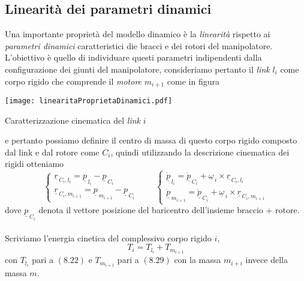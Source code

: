 \subsection{Linearità dei parametri dinamici}
Una importante proprietà del modello dinamico è la \emph{linearità} rispetto ai \emph{parametri dinamici} caratteristici die bracci e dei rotori del manipolatore. L'obiettivo è quello di individuare questi parametri indipendenti dalla configurazione dei giunti del manipolatore, consideriamo pertanto il \emph{link} $l_i$ come corpo rigido che comprende il \emph{motore} $m_{i+1}$ come in figura
\begin{center}
	\texttt{[image: linearitaProprietaDinamici.pdf]}
	\caption{Caratterizzazione cinematica del \emph{link} $i$}
\end{center}
e pertanto possiamo definire il centro di massa di questo corpo rigido composto dal link e dal rotore come $C_i$, quindi utilizzando la descrizione cinematica dei rigidi otteniamo
\begin{equation}
	\begin{cases}
		\underline{r}_{\,C_i,l_i} = \underline{p}_{\,l_i} - \underline{p}_{\,C_i} \\
		\underline{r}_{\,C_i,m_{i+1}} = \underline{p}_{\,m_{i+1}} - \underline{p}_{\,C_i} 
	\end{cases}
	\qquad
	\begin{cases}
		\underline{\dot{p}}_{\,l_i} = \underline{\dot{p}}_{\,C_i} + \underline{\omega}_{\,i} \times \underline{r}_{\,C_i,l_i} \\
		\underline{\dot{p}}_{\,m_{i+1}} = \underline{\dot{p}}_{\,C_i} + \underline{\omega}_{\,i} \times \underline{r}_{\,C_i,m_{i+1}}
	\end{cases}
\end{equation}
dove $\underline{p}_{\,C_i}$ denota il vettore posizione del baricentro dell'insieme braccio + rotore.

\paragraph{}
Scriviamo l'energia cinetica del complessivo corpo rigido $i$, 
\begin{equation}
	T_i = T_{l_i} + T_{m_{i+1}}
\end{equation}
con $T_{l_i}$ pari a $(8.22)$ e $T_{m_{i+1}}$ pari a $(8.29)$ con la massa $m_{i+i}$ invece della massa $m$.

